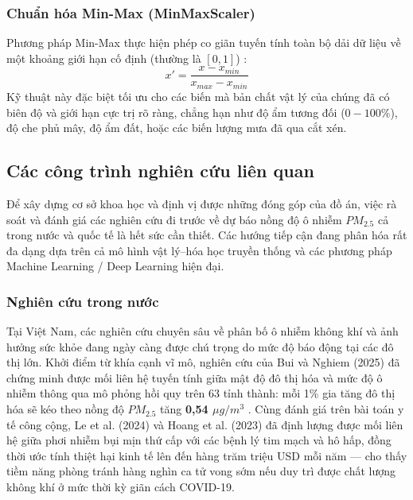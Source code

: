 \subsubsection{Chuẩn hóa Min-Max (MinMaxScaler)}
Phương pháp Min-Max thực hiện phép co giãn tuyến tính toàn bộ dải dữ liệu về một khoảng giới hạn cố định (thường là $[0, 1]$) \cite{han2011data}:
$$x' = \frac{x - x_{min}}{x_{max} - x_{min}}$$
Kỹ thuật này đặc biệt tối ưu cho các biến mà bản chất vật lý của chúng đã có biên độ và giới hạn cực trị rõ ràng, chẳng hạn như độ ẩm tương đối ($0 - 100\%$), độ che phủ mây, độ ẩm đất, hoặc các biến lượng mưa đã qua cắt xén.

\subsection{Các công trình nghiên cứu liên quan}

Để xây dựng cơ sở khoa học và định vị được những đóng góp của đồ án, việc rà soát và đánh giá các nghiên cứu đi trước về dự báo nồng độ ô nhiễm $PM_{2.5}$ cả trong nước và quốc tế là hết sức cần thiết. Các hướng tiếp cận đang phân hóa rất đa dạng dựa trên cả mô hình vật lý--hóa học truyền thống và các phương pháp Machine Learning / Deep Learning hiện đại.

\subsubsection{Nghiên cứu trong nước}

Tại Việt Nam, các nghiên cứu chuyên sâu về phân bố ô nhiễm không khí và ảnh hưởng sức khỏe đang ngày càng được chú trọng do mức độ báo động tại các đô thị lớn. Khởi điểm từ khía cạnh vĩ mô, nghiên cứu của Bui và Nghiem (2025) đã chứng minh được mối liên hệ tuyến tính giữa mật độ đô thị hóa và mức độ ô nhiễm thông qua mô phỏng hồi quy trên 63 tỉnh thành: mỗi 1\% gia tăng đô thị hóa sẽ kéo theo nồng độ $PM_{2.5}$ tăng \textbf{0,54 $\mu g/m^3$} \cite{bui2025urbanization}. Cùng đánh giá trên bài toán y tế công cộng, Le et al. (2024) \cite{le2024environmental} và Hoang et al. (2023) \cite{hoang2023health} đã định lượng được mối liên hệ giữa phơi nhiễm bụi mịn thứ cấp với các bệnh lý tim mạch và hô hấp, đồng thời ước tính thiệt hại kinh tế lên đến hàng trăm triệu USD mỗi năm --- cho thấy tiềm năng phòng tránh hàng nghìn ca tử vong sớm nếu duy trì được chất lượng không khí ở mức thời kỳ giãn cách COVID-19. 

